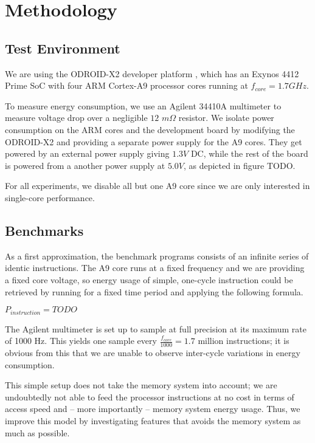 \section{Methodology}
\subsection{Test Environment}
We are using the ODROID-X2 developer platform \cite{odroid-x2}, which has an
Exynos 4412 Prime SoC with four ARM Cortex-A9 processor cores running at
$f_{core} = 1.7 GHz$.


To measure energy consumption, we use an Agilent 34410A multimeter to measure
voltage drop over a negligible $12$ $m\Omega$ resistor. We isolate power
consumption on the ARM cores and the development board by modifying the
ODROID-X2 and providing a separate power supply for the A9 cores. They get
powered by an external power supply giving $1.3V$ DC, while the rest of the
board is powered from a another power supply at $5.0V$, as depicted in figure
TODO.

For all experiments, we disable all but one A9 core since we are only interested
in single-core performance.

\subsection{Benchmarks}
As a first approximation, the benchmark programs consists of an infinite series
of identic instructions. The A9 core runs at a fixed frequency and we are
providing a fixed core voltage, so energy usage of simple, one-cycle instruction
could be retrieved by running for a fixed time period and applying the following
formula.

\begin{center}
$P_{instruction} = TODO$
\end{center}

The Agilent multimeter is set up to sample at full precision at its maximum rate
of 1000 Hz. This yields one sample every $\frac{ f_{core} }{ 1000 } = 1.7$
million instructions; it is obvious from this that we are unable to observe
inter-cycle variations in energy consumption.

This simple setup does not take the memory system into account; we are
undoubtedly not able to feed the processor instructions at no cost in terms of
access speed and -- more importantly -- memory system energy usage. Thus, we
improve this model by investigating features that avoids the memory system as
much as possible.

